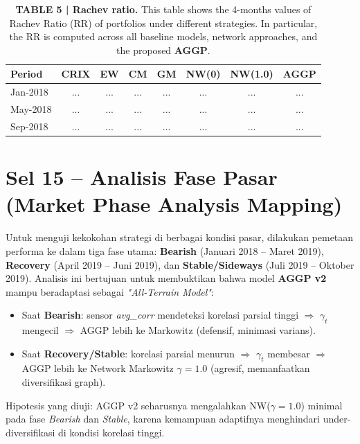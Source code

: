 \documentclass[12pt,a4paper]{article}
\begin{document}
\begin{table}[h]
    \centering
    \footnotesize
    \caption{\textbf{TABLE 5 | Rachev ratio.} This table shows the 4-months values of Rachev Ratio (RR) of portfolios under different strategies. In particular, the RR is computed across all baseline models, network approaches, and the proposed \textbf{AGGP}.}
    \begin{tabular}{lccccccc}
        \toprule
        Period & CRIX & EW & CM & GM & NW(0) & NW(1.0) & AGGP \\
        \midrule
        Jan-2018 & ... & ... & ... & ... & ... & ... & ... \\
        May-2018 & ... & ... & ... & ... & ... & ... & ... \\
        Sep-2018 & ... & ... & ... & ... & ... & ... & ... \\
        \bottomrule
    \end{tabular}
\end{table}

\section{Sel 15 -- Analisis Fase Pasar (Market Phase Analysis Mapping)}
Untuk menguji kekokohan strategi di berbagai kondisi pasar, dilakukan pemetaan performa ke dalam tiga fase utama: \textbf{Bearish} (Januari 2018 -- Maret 2019), \textbf{Recovery} (April 2019 -- Juni 2019), dan \textbf{Stable/Sideways} (Juli 2019 -- Oktober 2019). Analisis ini bertujuan untuk membuktikan bahwa model \textbf{AGGP v2} mampu beradaptasi sebagai \textit{"All-Terrain Model"}:
\begin{itemize}
    \item Saat \textbf{Bearish}: sensor \textit{avg\_corr} mendeteksi korelasi parsial tinggi $\Rightarrow$ $\gamma_t$ mengecil $\Rightarrow$ AGGP lebih ke Markowitz (defensif, minimasi varians).
    \item Saat \textbf{Recovery/Stable}: korelasi parsial menurun $\Rightarrow$ $\gamma_t$ membesar $\Rightarrow$ AGGP lebih ke Network Markowitz $\gamma=1.0$ (agresif, memanfaatkan diversifikasi graph).
\end{itemize}
Hipotesis yang diuji: AGGP v2 seharusnya mengalahkan NW($\gamma=1.0$) minimal pada fase \textit{Bearish} dan \textit{Stable}, karena kemampuan adaptifnya menghindari under-diversifikasi di kondisi korelasi tinggi.
\end{document}
